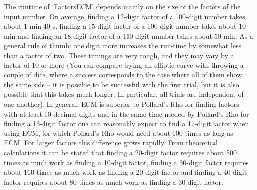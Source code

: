 The runtime of `FactorsECM' depends mainly on the size of the factors
of the input number.
On average, finding a 12-digit factor of a 100-digit number
takes about 1 min 40 s, finding a 15-digit factor of a 100-digit
number takes about 10 min and finding an 18-digit factor of a 100-digit
number takes about 50 min.
As a general rule of thumb: one digit more increases the run-time
by somewhat less than a factor of two.
These timings are very rough, and they may vary by a factor of 10 or more
(You can compare trying an elliptic curve with throwing a couple of dice,
where a success corresponds to the case where all of them show the same
side -- it is possible to be successful with the first trial, but it is
also possible that this takes much longer. In particular, all trials are
independent of one another).
In general, ECM is superior to Pollard's Rho for finding factors with at
least 10 decimal digits and in the same time needed by Pollard's Rho for
finding a 13-digit factor one can reasonably expect to find a
17-digit factor when using ECM, for which Pollard's Rho would need 
about 100 times as long as ECM. For larger factors this difference
grows rapidly.
From theoretical calculations it can be stated that finding a
20-digit factor requires about 500 times as much work as finding a
10-digit factor, finding a 30-digit factor requires about 160 times
as much work as finding a 20-digit factor and finding a 40-digit
factor requires about 80 times as much work as finding a 30-digit
factor.


